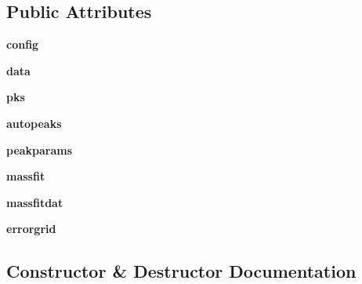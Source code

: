 \subsection*{Public Attributes}
\begin{DoxyCompactItemize}
\item 
\hypertarget{class_uni_dec_1_1unidec_1_1_uni_dec_a28836be64118dfcd95997b61d1782a33}{}{\bfseries config}\label{class_uni_dec_1_1unidec_1_1_uni_dec_a28836be64118dfcd95997b61d1782a33}

\item 
\hypertarget{class_uni_dec_1_1unidec_1_1_uni_dec_a3cf4b446d2c713a95cfdd928bbca79b8}{}{\bfseries data}\label{class_uni_dec_1_1unidec_1_1_uni_dec_a3cf4b446d2c713a95cfdd928bbca79b8}

\item 
\hypertarget{class_uni_dec_1_1unidec_1_1_uni_dec_ac3b8504e02825eb0c504efd7172973a4}{}{\bfseries pks}\label{class_uni_dec_1_1unidec_1_1_uni_dec_ac3b8504e02825eb0c504efd7172973a4}

\item 
\hypertarget{class_uni_dec_1_1unidec_1_1_uni_dec_a06b503d2d3afacf60b5348e1a8ccd0ae}{}{\bfseries autopeaks}\label{class_uni_dec_1_1unidec_1_1_uni_dec_a06b503d2d3afacf60b5348e1a8ccd0ae}

\item 
\hypertarget{class_uni_dec_1_1unidec_1_1_uni_dec_a82f0bb441368fe7ba86423e7c2833bdd}{}{\bfseries peakparams}\label{class_uni_dec_1_1unidec_1_1_uni_dec_a82f0bb441368fe7ba86423e7c2833bdd}

\item 
\hypertarget{class_uni_dec_1_1unidec_1_1_uni_dec_a342644901005aaf3f7dd7dd89701976e}{}{\bfseries massfit}\label{class_uni_dec_1_1unidec_1_1_uni_dec_a342644901005aaf3f7dd7dd89701976e}

\item 
\hypertarget{class_uni_dec_1_1unidec_1_1_uni_dec_a120ae2912e23a3078bbbe7a20544c05a}{}{\bfseries massfitdat}\label{class_uni_dec_1_1unidec_1_1_uni_dec_a120ae2912e23a3078bbbe7a20544c05a}

\item 
\hypertarget{class_uni_dec_1_1unidec_1_1_uni_dec_a5700b9c26db162c8051d4a37da2f047d}{}{\bfseries errorgrid}\label{class_uni_dec_1_1unidec_1_1_uni_dec_a5700b9c26db162c8051d4a37da2f047d}

\end{DoxyCompactItemize}


\subsection{Constructor \& Destructor Documentation}
\hypertarget{class_uni_dec_1_1unidec_1_1_uni_dec_a4f9df0b60a83a61b2a7e807be4b43d88}{}
